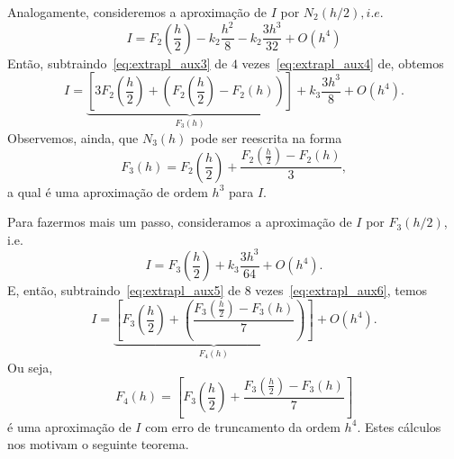 Analogamente, consideremos a aproximação de $I$ por $N_2(h/2), i.e.$
\begin{equation}\label{eq:extrapl_aux4}
  I = F_2\left(\frac{h}{2}\right) - k_2\frac{h^2}{8} - k_2\frac{3h^3}{32} + O(h^4)
\end{equation}
Então, subtraindo~\eqref{eq:extrapl_aux3} de $4$ vezes~\eqref{eq:extrapl_aux4} de, obtemos
\begin{equation}\label{eq:extrapl_aux5}
  I = \underbrace{\left[3F_2\left(\frac{h}{2}\right) + \left(F_2\left(\frac{h}{2}\right) - F_2(h)\right)\right]}_{F_3(h)} + k_3\frac{3h^3}{8} + O(h^4).
\end{equation}
Observemos, ainda, que $N_3(h)$ pode ser reescrita na forma
\begin{equation}
  F_3(h) = F_2\left(\frac{h}{2}\right) + \frac{F_2\left(\frac{h}{2}\right) - F_2(h)}{3},
\end{equation}
a qual é uma aproximação de ordem $h^3$ para $I$.

Para fazermos mais um passo, consideramos a aproximação de $I$ por $F_3(h/2)$, i.e.
\begin{equation}\label{eq:extrapl_aux6}
  I = F_3\left(\frac{h}{2}\right) + k_3\frac{3h^3}{64} + O(h^4).
\end{equation}
E, então, subtraindo~\eqref{eq:extrapl_aux5} de $8$ vezes~\eqref{eq:extrapl_aux6}, temos
\begin{equation}
  I = \underbrace{\left[F_3\left(\frac{h}{2} \right)+ \left(\frac{F_3\left(\frac{h}{2}\right)-F_3(h)}{7}\right)\right]}_{F_4(h)} + O(h^4).
\end{equation}
Ou seja,
\begin{equation}
  F_4(h) = \left[F_3\left(\frac{h}{2}\right) + \frac{F_3\left(\frac{h}{2}\right)-F_3(h)}{7}\right]
\end{equation}
é uma aproximação de $I$ com erro de truncamento da ordem $h^4$. Estes cálculos nos motivam o seguinte teorema.

